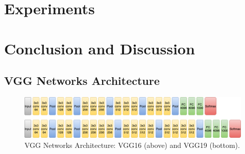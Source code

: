 \documentclass{article} %
\begin{document}
\section{Experiments}
\label{exp}





\section{Conclusion and Discussion}




\newpage
\begin{appendix}
\section{VGG Networks Architecture}
\begin{figure}[ht]
\includegraphics[scale=0.3]{VGG.png}
\caption{VGG Networks Architecture: VGG16 (above) and VGG19 (bottom).}
\label{vgg}
\end{figure}

\end{appendix}
\end{document}
